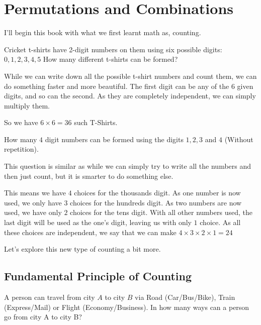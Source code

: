 \chapter{Permutations and Combinations} 

I'll begin this book with what we first learnt math as, counting.

\begin{example}
Cricket t-shirts have 2-digit numbers on them using six possible digits: $0, 1, 2, 3, 4, 5$ How many 
different t-shirts can be formed?
\end{example}

While we can write down all the possible t-shirt numbers and count them, we can do something 
faster and more beautiful. The first digit can be any of the $6$ given digits, and so can the
 second. As they are completely independent, we can simply multiply them.\par
So we have $6 \times 6=36$ such T-Shirts.

\begin{example}
How many $4$ digit numbers can be formed using the digits $1, 2, 3$ and $4$ (Without repetition).
\end{example}

This question is similar as while we can simply try to write all the numbers and then just count, 
but it is smarter to do something else.\par
This means we have $4$ choices for the thousands digit. As one number is now used, we only have
 $3$ choices for the hundreds digit. As two numbers are now used, we have only $2$ choices for 
 the tens digit. With all other numbers used, the last digit will be used as the one's digit, 
 leaving us with only $1$ choice. As all these choices are independent, we say that we can make 
 $4 \times 3 \times 2 \times 1 = 24$\par
Let's explore this new type of counting a bit more.

\section{Fundamental Principle of Counting}

\begin{example}
A person can travel from city $A$ to city $B$ via Road (Car/Bus/Bike), Train 
(Express/Mail) or Flight (Economy/Business). In how many ways can a person go from city A to city B?
\end{example}


